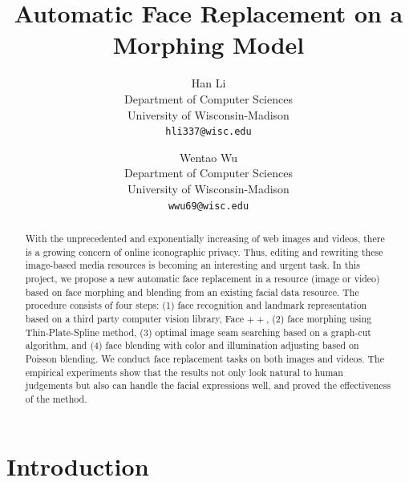 \documentclass[10pt,twocolumn,letterpaper]{article}
\begin{document}
\title{Automatic Face Replacement on a Morphing Model}

\author{Han Li\\
Department of Computer Sciences\\
University of Wisconsin-Madison\\
{\tt\small hli337@wisc.edu}
\and
Wentao Wu\\
Department of Computer Sciences\\
University of Wisconsin-Madison\\
{\tt\small wwu69@wisc.edu}
}

\maketitle

\begin{abstract}
   With the unprecedented and exponentially increasing of web images and videos,  there is a growing concern of online iconographic privacy. Thus, editing and rewriting these image-based media resources is becoming an interesting and urgent task. In this project, we propose a new automatic face replacement in a resource (image or video) based on face morphing and blending from an existing facial data resource. The procedure consists of four steps: (1) face recognition and landmark representation based on a third party computer vision library, Face $++$, (2) face morphing using Thin-Plate-Spline method, (3) optimal image seam searching based on a graph-cut algorithm, and (4) face blending with color and illumination adjusting based on Poisson blending. We conduct face replacement tasks on both images and videos. The empirical experiments show that the results not only look natural to human judgements but also can handle the facial expressions well, and proved the effectiveness of the method.
\end{abstract}
\section{Introduction}
\end{document}
